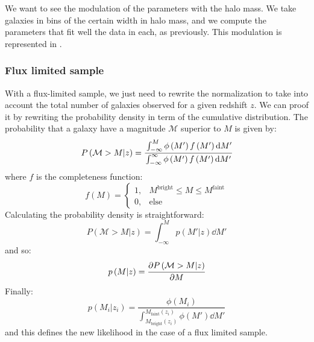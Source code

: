 We want to see the modulation of the parameters with the halo mass. We take
galaxies in bins of the certain width in halo mass, and we compute the
parameters that fit well the data in each, as previously. This modulation is
represented in .

\subsubsection{Flux limited sample}

With a flux-limited sample, we just need to rewrite the normalization to take
into account the total number of galaxies observed for a given redshift $z$. We
can proof it by rewriting the probability density in term of the cumulative
distribution. The probability that a galaxy have a magnitude $\mathcal{M}$
superior to $M$ is given by:
%
\begin{equation}
    \label{eq:cumprobfluxlim}
    P\left(\mathcal{M}>M|z\right)=
    \cfrac{\int_{-\infty}^M \phi\left(M'\right)f\left(M'\right){\rm{d}} M'}
    {\int_{-\infty}^\infty \phi\left(M'\right)f\left(M'\right){\rm{d}} M'}
\end{equation}
%
where $f$ is the completeness function:
%
\begin{equation}
    f\left(M\right) = \begin{cases}
        1, &M^\mathrm{bright}\leq M \leq M^\mathrm{faint} \\
        0, & \mbox{else}
        \end{cases}
\end{equation}
%
Calculating the probability density is straightforward:
%
\begin{equation}
    P\left(\mathcal{M}>M|z\right)=\int_{-\infty}^M p\left(M'|z\right)\dd M'
\end{equation}
%
and so:
%
\begin{equation}
    p\left(M|z\right)=\cfrac{{\partial} P\left(\mathcal{M}>M|z\right)}{{\partial} M}
\end{equation}
%
Finally:
%
\begin{equation}
    p\left(M_i|z_i\right)=
    \dfrac{\phi\left(M_i\right)}
    {\int_{M_\mathrm{bright}\left(z_i\right)}^
        {M_\mathrm{faint}\left(z_i\right)}
        \phi\left(M'\right)\dd M'}
\end{equation}
%
and this defines the new likelihood in the case of a flux limited sample.

